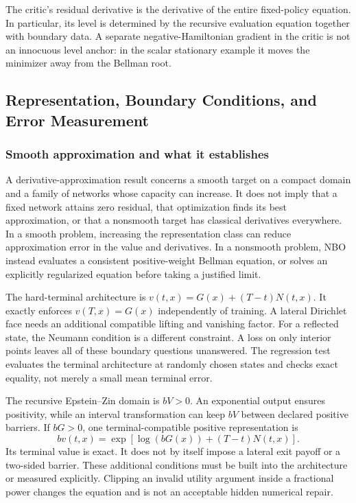 The critic's residual derivative is the derivative of the entire fixed-policy equation. In particular, its level is determined by the recursive evaluation equation together with boundary data. A separate negative-Hamiltonian gradient in the critic is not an innocuous level anchor: in the scalar stationary example it moves the minimizer away from the Bellman root.

\subsection{Representation, Boundary Conditions, and Error Measurement}
\subsubsection{Smooth approximation and what it establishes}
A derivative-approximation result concerns a smooth target on a compact domain and a family of networks whose capacity can increase. It does not imply that a fixed network attains zero residual, that optimization finds its best approximation, or that a nonsmooth target has classical derivatives everywhere. In a smooth problem, increasing the representation class can reduce approximation error in the value and derivatives. In a nonsmooth problem, NBO instead evaluates a consistent positive-weight Bellman equation, or solves an explicitly regularized equation before taking a justified limit.

The hard-terminal architecture is $v(t,x)=G(x)+(T-t)N(t,x)$. It exactly enforces $v(T,x)=G(x)$ independently of training. A lateral Dirichlet face needs an additional compatible lifting and vanishing factor. For a reflected state, the Neumann condition is a different constraint. A loss on only interior points leaves all of these boundary questions unanswered. The regression test evaluates the terminal architecture at randomly chosen states and checks exact equality, not merely a small mean terminal error.

The recursive Epstein--Zin domain is $bV>0$. An exponential output ensures positivity, while an interval transformation can keep $bV$ between declared positive barriers. If $bG>0$, one terminal-compatible positive representation is
\[
 bv(t,x)=\exp\left[\log(bG(x))+(T-t)N(t,x)\right].
\]
Its terminal value is exact. It does not by itself impose a lateral exit payoff or a two-sided barrier. These additional conditions must be built into the architecture or measured explicitly. Clipping an invalid utility argument inside a fractional power changes the equation and is not an acceptable hidden numerical repair.

